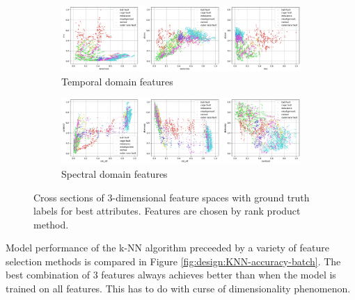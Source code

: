 \begin{figure}[ht]
    \centering
    \begin{subfigure}[b]{\textwidth}
        \includegraphics[width=\textwidth]{assets/design/best-features-scatter-fault-A-temporal.png}
        \caption{Temporal domain features}
    \end{subfigure}
    \hfill
    \begin{subfigure}[b]{\textwidth}
        \includegraphics[width=\textwidth]{assets/design/best-features-scatter-fault-A-spectral.png}
        \caption{Spectral domain features}
    \end{subfigure} 
    \caption{Cross sections of 3-dimensional feature spaces with ground truth labels for best attributes. Features are chosen by rank product method.}
    \label{fig:design:feature-space-scatter}
\end{figure}

Model performance of the k-NN algorithm preceeded by a variety of feature selection methods is compared in Figure \ref{fig:design:KNN-accuracy-batch}. The best combination of 3 features always achieves better than when the model is trained on all features. This has to do with curse of dimensionality phenomenon. 

